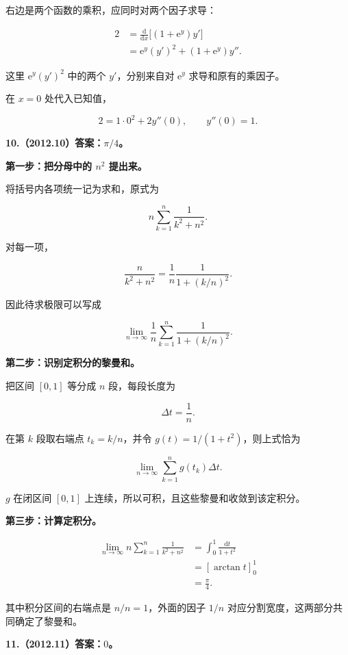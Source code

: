 \documentclass[UTF8,11pt,fontset=windows]{ctexart}
\begin{document}
右边是两个函数的乘积，应同时对两个因子求导：

$$
\begin{aligned}
2
&=\frac{\mathrm d}{\mathrm dx}\big[(1+\mathrm e^y)y'\big]\\
&=\mathrm e^y(y')^2+(1+\mathrm e^y)y''.
\end{aligned}
$$

这里 $\mathrm e^y(y')^2$ 中的两个 $y'$，分别来自对 $\mathrm e^y$ 求导和原有的乘因子。

在 $x=0$ 处代入已知值，

$$
2=1\cdot0^2+2y''(0),
\qquad y''(0)=1.
$$

\clearpage

\textbf{10.（2012.10）答案：$\pi/4$。}

\textbf{第一步：把分母中的 $n^2$ 提出来。}

将括号内各项统一记为求和，原式为

$$
n\sum_{k=1}^{n}\frac1{k^2+n^2}.
$$

对每一项，

$$
\frac{n}{k^2+n^2}
=\frac1n\frac1{1+(k/n)^2}.
$$

因此待求极限可以写成

$$
\lim_{n\to\infty}\frac1n
\sum_{k=1}^{n}\frac1{1+(k/n)^2}.
$$

\textbf{第二步：识别定积分的黎曼和。}

把区间 $[0,1]$ 等分成 $n$ 段，每段长度为

$$
\Delta t=\frac1n.
$$

在第 $k$ 段取右端点 $t_k=k/n$，并令 $g(t)=1/(1+t^2)$，则上式恰为

$$
\lim_{n\to\infty}\sum_{k=1}^{n}g(t_k)\Delta t.
$$

$g$ 在闭区间 $[0,1]$ 上连续，所以可积，且这些黎曼和收敛到该定积分。

\textbf{第三步：计算定积分。}

$$
\begin{aligned}
\lim_{n\to\infty}n\sum_{k=1}^{n}\frac1{k^2+n^2}
&=\int_0^1\frac{\mathrm dt}{1+t^2}\\
&=[\arctan t]_0^1\\
&=\frac\pi4.
\end{aligned}
$$

其中积分区间的右端点是 $n/n=1$，外面的因子 $1/n$ 对应分割宽度，这两部分共同确定了黎曼和。

\clearpage

\textbf{11.（2012.11）答案：$0$。}
\end{document}
